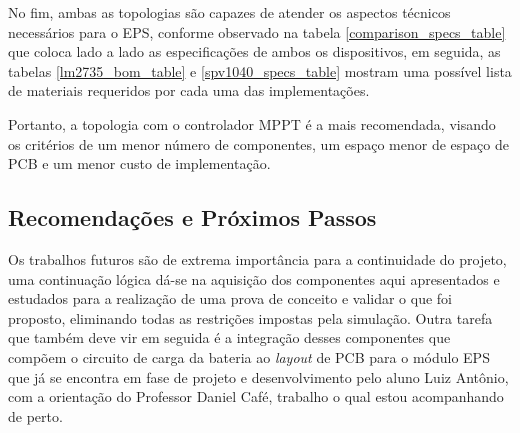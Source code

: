 



No fim, ambas as topologias são capazes de atender os aspectos técnicos necessários para o EPS, conforme observado na tabela \ref{comparison_specs_table} que coloca lado a lado as especificações de ambos os dispositivos, em seguida, as tabelas \ref{lm2735_bom_table} e \ref{spv1040_specs_table} mostram uma possível lista de materiais requeridos por cada uma das implementações.



Portanto, a topologia com o controlador MPPT é a mais recomendada, visando os critérios de um menor número de componentes, um espaço menor de espaço de PCB e um menor custo de implementação.

\subsection*{Recomendações e Próximos Passos}

Os trabalhos futuros são de extrema importância para a continuidade do projeto, uma continuação lógica dá-se na aquisição dos componentes aqui apresentados e estudados para a realização de uma prova de conceito e validar o que foi proposto, eliminando todas as restrições impostas pela simulação. Outra tarefa que também deve vir em seguida é a integração desses componentes que compõem o circuito de carga da bateria ao \textit{layout} de PCB para o módulo EPS que já se encontra em fase de projeto e desenvolvimento pelo aluno Luiz Antônio, com a orientação do Professor Daniel Café, trabalho o qual estou acompanhando de perto.

